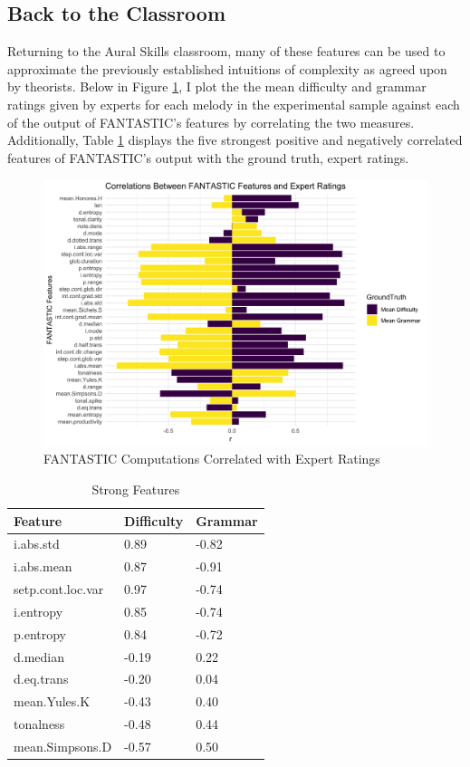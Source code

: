 \documentclass[12pt,]{book}
\begin{document}
\hypertarget{back-to-the-classroom}{%
\subsection{Back to the Classroom}\label{back-to-the-classroom}}

Returning to the Aural Skills classroom, many of these features can be used to approximate the previously established intuitions of complexity as agreed upon by theorists.
Below in Figure \ref{fig:corfeature}, I plot the the mean difficulty and grammar ratings given by experts for each melody in the experimental sample against each of the output of FANTASTIC's features by correlating the two measures.
Additionally, Table \ref{tab:corfeaturetable} displays the five strongest positive and negatively correlated features of FANTASTIC's output with the ground truth, expert ratings.

\begin{figure}

{\centering \includegraphics[width=1\linewidth]{img/FantasticExpertPlot} 

}

\caption{FANTASTIC Computations Correlated with Expert Ratings}\label{fig:corfeature}
\end{figure}

\begin{longtable}{lll}
\caption{\label{tab:corfeaturetable}Strong Features}\\
\toprule
Feature & Difficulty & Grammar\\
\midrule
i.abs.std & 0.89 & -0.82\\
i.abs.mean & 0.87 & -0.91\\
setp.cont.loc.var & 0.97 & -0.74\\
i.entropy & 0.85 & -0.74\\
p.entropy & 0.84 & -0.72\\
d.median & -0.19 & 0.22\\
d.eq.trans & -0.20 & 0.04\\
mean.Yules.K & -0.43 & 0.40\\
tonalness & -0.48 & 0.44\\
mean.Simpsons.D & -0.57 & 0.50\\
\bottomrule
\end{longtable}
\end{document}
